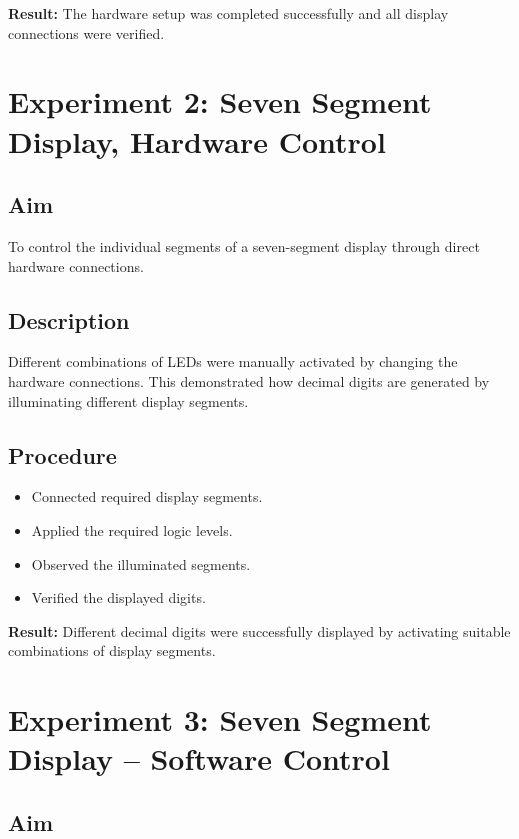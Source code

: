 \documentclass[12pt,a4paper]{report}
\begin{document}
\textbf{Result:} The hardware setup was completed successfully and all display connections were verified.

\section{Experiment 2: Seven Segment Display, Hardware Control}

\subsection*{Aim}

To control the individual segments of a seven-segment display through direct hardware connections.

\subsection*{Description}

Different combinations of LEDs were manually activated by changing the hardware connections. This demonstrated how decimal digits are generated by illuminating different display segments.

\subsection*{Procedure}

\begin{itemize}
\item Connected required display segments.
\item Applied the required logic levels.
\item Observed the illuminated segments.
\item Verified the displayed digits.
\end{itemize}

\textbf{Result:} Different decimal digits were successfully displayed by activating suitable combinations of display segments.

\section{Experiment 3: Seven Segment Display – Software Control}

\subsection*{Aim}
\end{document}
